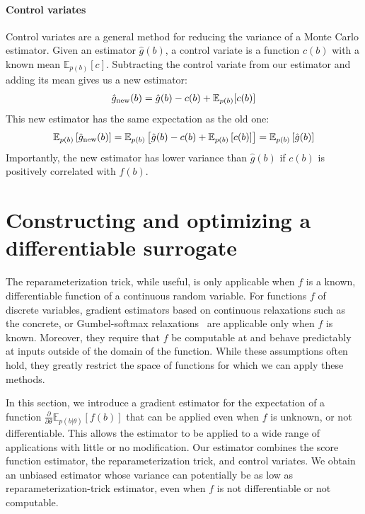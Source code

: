 \documentclass{article}
\newcommand{\controlf}{c}  %
\newcommand{\E}{\mathbb{E}}
\newcommand{\PT}{\frac{\partial}{\partial \theta}}
\begin{document}
\paragraph{Control variates}
Control variates are a general method for reducing the variance of a Monte Carlo estimator.
Given an estimator $\hat g(b)$, a control variate is a function $\controlf(b)$ with a known mean $\mathbb{E}_{p(b)} [ \controlf ]$.
Subtracting the control variate from our estimator and adding its mean gives us a new estimator:
%
\begin{align}
\hat g_\textnormal{new}(b) = \hat g(b) - \controlf(b) + \mathbb{E}_{p(b)}[\controlf(b)]
\end{align}
%
This new estimator has the same expectation as the old one:
%
\begin{align}
\mathbb{E}_{p(b)}\left[\hat g_\textnormal{new}(b) \right] 
= \mathbb{E}_{p(b)}\left[\hat g(b) - \controlf(b) + \mathbb{E}_{p(b)} \left[ \controlf(b) \right] \right]
= \mathbb{E}_{p(b)}\left[ \hat g(b) \right]
\end{align}
%
Importantly, the new estimator has lower variance than $\hat g(b)$ if $\controlf(b)$ is positively correlated with $f(b)$.



\section{Constructing and optimizing a differentiable surrogate}
\label{lax section}
The reparameterization trick, while useful, is only applicable when $f$ is a known, differentiable function of a continuous random variable.
For functions $f$ of discrete variables, gradient estimators based on continuous relaxations such as the concrete, or Gumbel-softmax relaxations~\cite{maddison2016concrete, jang2016categorical} are applicable only when $f$ is known.
Moreover, they require that $f$ be computable at and behave predictably at inputs outside of the domain of the function.
While these assumptions often hold, they greatly restrict the space of functions for which we can apply these methods. 

In this section, we introduce a gradient estimator for the expectation of a function $\PT \E_{p(b|\theta)}[f(b)]$ that can be applied even when $f$ is unknown, or not differentiable.
This allows the estimator to be applied to a wide range of applications with little or no modification.
Our estimator combines the score function estimator, the reparameterization trick, and control variates.
We obtain an unbiased estimator whose variance can potentially be as low as reparameterization-trick estimator, even when $f$ is not differentiable or not computable.
\end{document}
